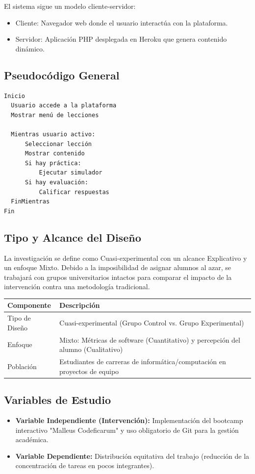\documentclass[12pt,a4paper]{article}
\begin{document}
El sistema sigue un modelo cliente-servidor:
\begin{itemize}
    \item Cliente: Navegador web donde el usuario interactúa con la plataforma.
    \item Servidor: Aplicación PHP desplegada en Heroku que genera contenido dinámico.
\end{itemize}

\subsection{Pseudocódigo General}

\begin{verbatim}
Inicio
  Usuario accede a la plataforma
  Mostrar menú de lecciones

  Mientras usuario activo:
      Seleccionar lección
      Mostrar contenido
      Si hay práctica:
          Ejecutar simulador
      Si hay evaluación:
          Calificar respuestas
  FinMientras
Fin
\end{verbatim}


\subsection{Tipo y Alcance del Diseño}
La investigación se define como Cuasi-experimental con un alcance Explicativo y un enfoque Mixto. Debido a la imposibilidad de asignar alumnos al azar, se trabajará con grupos universitarios intactos para comparar el impacto de la intervención contra una metodología tradicional.

\begin{table}[h]
\centering
\begin{tabular}{|l|l|}
\hline
Componente & Descripción \\
\hline
Tipo de Diseño & Cuasi-experimental (Grupo Control vs. Grupo Experimental) \\
\hline
Enfoque & Mixto: Métricas de software (Cuantitativo) y percepción del alumno (Cualitativo) \\
\hline
Población & Estudiantes de carreras de informática/computación en proyectos de equipo \\
\hline
\end{tabular}
\end{table}

\subsection{Variables de Estudio}
\begin{itemize}
    \item \textbf{Variable Independiente (Intervención):} Implementación del bootcamp interactivo "Malleus Codeficarum" y uso obligatorio de Git para la gestión académica.
    \item \textbf{Variable Dependiente:} Distribución equitativa del trabajo (reducción de la concentración de tareas en pocos integrantes).
\end{itemize}
\end{document}
